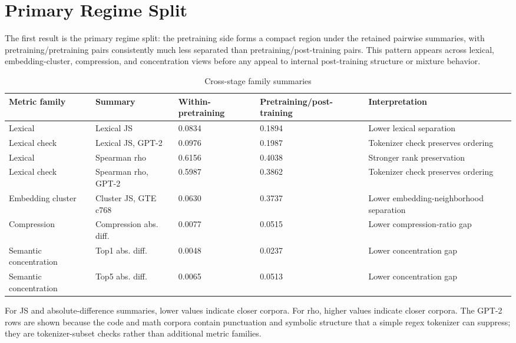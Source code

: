 \documentclass[11pt]{article}
\begin{document}
\section{Primary Regime Split}\label{primary-regime-split}

The first result is the primary regime split: the pretraining side forms a compact region under the retained pairwise summaries, with pretraining/pretraining pairs consistently much less separated than pretraining/post-training pairs. This pattern appears across lexical, embedding-cluster, compression, and concentration views before any appeal to internal post-training structure or mixture behavior.

\begingroup\small
\renewcommand{\arraystretch}{1.18}
\begin{longtable}{@{}L{0.14\textwidth}L{0.20\textwidth}R{0.11\textwidth}R{0.15\textwidth}L{0.30\textwidth}@{}}
\caption{Cross-stage family summaries}\label{tab:2}\\
\toprule\noalign{}
Metric family & Summary & Within-pretraining & Pretraining/post-training & Interpretation \\
\midrule\noalign{}
\endhead
\bottomrule\noalign{}
\endlastfoot
Lexical & Lexical JS & 0.0834 & 0.1894 & Lower lexical separation \\
Lexical check & Lexical JS, GPT-2 & 0.0976 & 0.1987 & Tokenizer check preserves ordering \\
Lexical & Spearman rho & 0.6156 & 0.4038 & Stronger rank preservation \\
Lexical check & Spearman rho, GPT-2 & 0.5987 & 0.3862 & Tokenizer check preserves ordering \\
Embedding cluster & Cluster JS, GTE c768 & 0.0630 & 0.3737 & Lower embedding-neighborhood separation \\
Compression & Compression abs. diff. & 0.0077 & 0.0515 & Lower compression-ratio gap \\
Semantic concentration & Top1 abs. diff. & 0.0048 & 0.0237 & Lower concentration gap \\
Semantic concentration & Top5 abs. diff. & 0.0065 & 0.0513 & Lower concentration gap \\
\end{longtable}
\endgroup

For JS and absolute-difference summaries, lower values indicate closer corpora. For rho, higher values indicate closer corpora. The GPT-2 rows are shown because the code and math corpora contain punctuation and symbolic structure that a simple regex tokenizer can suppress; they are tokenizer-subset checks rather than additional metric families.
\end{document}
